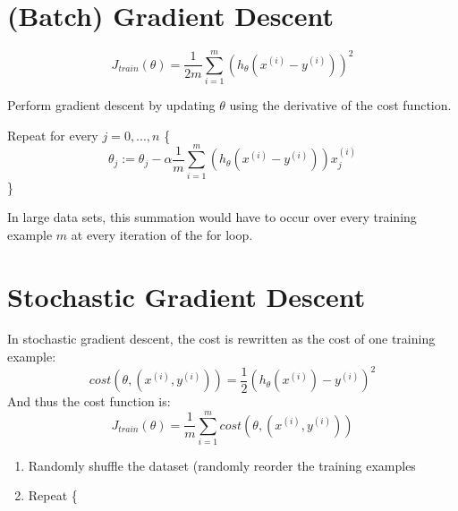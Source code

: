 \documentclass{article}
\begin{document}
\begin{landscape}
\thispagestyle{empty}
\begin{multicols}{2}

\section*{(Batch) Gradient Descent}
\begin{equation*}
    J_{train}(\theta) = \frac{1}{2m} \sum_{i=1}^m(h_{\theta}(x^{(i)} - y^{(i)}))^2
\end{equation*}

Perform gradient descent by updating $\theta$ using the derivative of the cost function.

Repeat for every  $j=0,...,n$ \{
\begin{equation*}
    \theta_j := \theta_j - \alpha\frac{1}{m}\sum_{i=1}^m(h_{\theta}(x^{(i)} - y^{(i)}))x_j^{(i)}
\end{equation*}
\}

In large data sets, this summation would have to occur over every training example $m$ at every iteration of the for loop.

\vfill
\columnbreak

\section*{Stochastic Gradient Descent}
In stochastic gradient descent, the cost is rewritten as the cost of one training example:
\begin{equation*}
    cost(\theta, (x^{(i)}, y^{(i)})) = \frac{1}{2}(h_\theta(x^{(i)})-y^{(i)})^2
\end{equation*}
And thus the cost function is:
\begin{equation*}
    J_{train}(\theta) = \frac{1}{m}\sum_{i=1}^m cost(\theta, (x^{(i)}, y^{(i)}))
\end{equation*}

\begin{enumerate}
    \item Randomly shuffle the dataset (randomly reorder the training examples
    \item Repeat \{
\end{enumerate}
\end{multicols}
\end{landscape}
\end{document}
